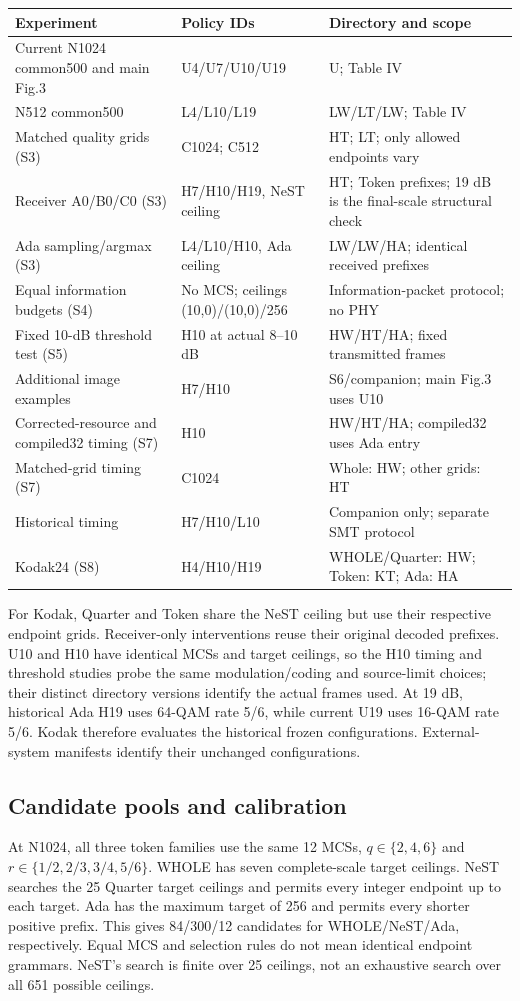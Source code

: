 \documentclass[10pt,letterpaper]{article}
\begin{document}
{\small\setlength{\tabcolsep}{3pt}\begin{longtable}{@{}p{6.2cm}p{3.1cm}p{6.0cm}@{}}\toprule
Experiment & Policy IDs & Directory and scope\\\midrule\endhead
Current N1024 common500 and main Fig.3 & U4/U7/U10/U19 & U; Table IV\\
N512 common500 & L4/L10/L19 & LW/LT/LW; Table IV\\
Matched quality grids (S3) & C1024; C512 & HT; LT; only allowed endpoints vary\\
Receiver A0/B0/C0 (S3) & H7/H10/H19, NeST ceiling & HT; Token prefixes; 19 dB is the final-scale structural check\\
Ada sampling/argmax (S3) & L4/L10/H10, Ada ceiling & LW/LW/HA; identical received prefixes\\
Equal information budgets (S4) & No MCS; ceilings (10,0)/(10,0)/256 & Information-packet protocol; no PHY\\
Fixed 10-dB threshold test (S5) & H10 at actual 8--10 dB & HW/HT/HA; fixed transmitted frames\\
Additional image examples & H7/H10 & S6/companion; main Fig.3 uses U10\\
Corrected-resource and compiled32 timing (S7) & H10 & HW/HT/HA; compiled32 uses Ada entry\\
Matched-grid timing (S7) & C1024 & Whole: HW; other grids: HT\\
Historical timing & H7/H10/L10 & Companion only; separate SMT protocol\\
Kodak24 (S8) & H4/H10/H19 & WHOLE/Quarter: HW; Token: KT; Ada: HA\\
\bottomrule\end{longtable}}
For Kodak, Quarter and Token share the NeST ceiling but use their respective endpoint grids. Receiver-only interventions reuse their original decoded prefixes. U10 and H10 have identical MCSs and target ceilings, so the H10 timing and threshold studies probe the same modulation/coding and source-limit choices; their distinct directory versions identify the actual frames used. At 19 dB, historical Ada H19 uses 64-QAM rate 5/6, while current U19 uses 16-QAM rate 5/6. Kodak therefore evaluates the historical frozen configurations. External-system manifests identify their unchanged configurations.

\subsection{Candidate pools and calibration}
At N1024, all three token families use the same 12 MCSs, $q\in\{2,4,6\}$ and $r\in\{1/2,2/3,3/4,5/6\}$. WHOLE has seven complete-scale target ceilings. NeST searches the 25 Quarter target ceilings and permits every integer endpoint up to each target. Ada has the maximum target of 256 and permits every shorter positive prefix. This gives 84/300/12 candidates for WHOLE/NeST/Ada, respectively. Equal MCS and selection rules do not mean identical endpoint grammars. NeST's search is finite over 25 ceilings, not an exhaustive search over all 651 possible ceilings.
\end{document}

